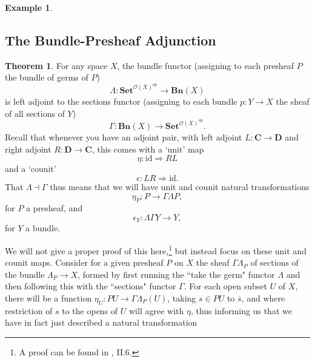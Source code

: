 \documentclass[a4paper]{book}
\theoremstyle{definition}
\newtheorem{example}{Example}[section]
\theoremstyle{definition}
\theoremstyle{definition}
\newtheorem{theorem}{Theorem}[section]
\theoremstyle{theorem}
\theoremstyle{definition}
\begin{document}
\begin{example}
	\subsection{The Bundle-Presheaf Adjunction}
	\begin{theorem}
		For any space $X$, the bundle functor (assigning to each presheaf $P$ the bundle of germs of $P$)
		\begin{equation*}
		\Lambda: \textbf{Set}^{\mathscr{O}(X)^{op}} \rightarrow \textbf{Bn}(X)
		\end{equation*}
		is left adjoint to the sections functor (assigning to each bundle $p: Y \rightarrow X$ the sheaf of all sections of $Y$) 
		\begin{equation*}
		\Gamma: \textbf{Bn}(X) \rightarrow \textbf{Set}^{\mathscr{O}(X)^{op}}.
		\end{equation*}
		Recall that whenever you have an adjoint pair, with left adjoint $L: \textbf{C} \rightarrow \textbf{D}$ and right adjoint $R: \textbf{D} \rightarrow \textbf{C}$, this comes with a `unit' map 
		\begin{equation*}
		\eta: \text{id} \Rightarrow RL
		\end{equation*} 
		and a `counit' 
		\begin{equation*}
		\epsilon: LR \Rightarrow \text{id}.
		\end{equation*}
		That $\Lambda \dashv \Gamma$ thus means that we will have unit and counit natural transformations  
		\begin{equation*}
		\eta_P: P \rightarrow \Gamma \Lambda P, 
		\end{equation*}
		for $P$ a presheaf, 
		and 
		\begin{equation*}
		\epsilon_Y: \Lambda \Gamma Y \rightarrow Y,
		\end{equation*}
		for $Y$ a bundle. 
	\end{theorem}
We will not give a proper proof of this here,\footnote{A proof can be found in \cite{maclane_sheaves_1994}, II.6.} but instead focus on these unit and counit maps. Consider for a given presheaf $P$ on $X$ the sheaf $\Gamma \Lambda_P$ of sections of the bundle $\Lambda_P \rightarrow X$, formed by first running the ``take the germ" functor $\Lambda$ and then following this with the ``sections" functor $\Gamma$. For each open subset $U$ of $X$, there will be a function $\eta_U: PU \rightarrow \Gamma \Lambda_P (U)$, taking $s \in PU$ to $\overline{s}$, and where restriction of $s$ to the opens of $U$ will agree with $\eta$, thus informing us that we have in fact just described a natural transformation

\end{example}
\end{document}
